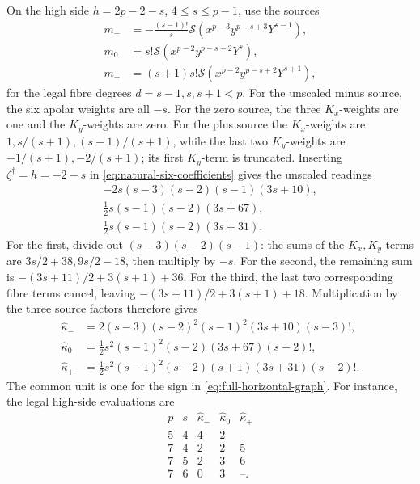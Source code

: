 \documentclass[11pt]{article}
\theoremstyle{plain}
\theoremstyle{definition}
\theoremstyle{remark}
\numberwithin{equation}{section}
\begin{document}
On the high side \(h=2p-2-s\), \(4\le s\le p-1\),
use the sources
\[
\begin{aligned}
 m_-&=-\frac{(s-1)!}{s}
       \mathscr S(x^{p-3}y^{p-s+3}Y^{s-1}),\\
 m_0&=s!\mathscr S(x^{p-2}y^{p-s+2}Y^s),\\
 m_+&=(s+1)s!\mathscr S(x^{p-2}y^{p-s+2}Y^{s+1}),
\end{aligned}
\]
for the legal fibre degrees \(d=s-1,s,s+1<p\).
For the unscaled minus source, the six apolar weights are all
\(-s\). For the zero source, the three \(K_x\)-weights are one
and the \(K_y\)-weights are zero. For the plus source the
\(K_x\)-weights are
\(1,s/(s+1),(s-1)/(s+1)\), while the last two \(K_y\)-weights
are \(-1/(s+1),-2/(s+1)\); its first \(K_y\)-term is truncated.
Inserting \(\zeta^\dagger=h=-2-s\) in
\eqref{eq:natural-six-coefficients} gives the unscaled readings
\[
\begin{aligned}
 -2s(s-3)(s-2)(s-1)(3s+10),\\
 \tfrac12s(s-1)(s-2)(3s+67),\\
 \tfrac12s(s-1)(s-2)(3s+31).
\end{aligned}
\]
For the first, divide out \((s-3)(s-2)(s-1)\):
the sums of the \(K_x,K_y\) terms are \(3s/2+38,9s/2-18\),
then multiply by \(-s\).
For the second, the remaining sum is
\(-(3s+11)/2+3(s+1)+36\).
For the third, the last two corresponding fibre terms cancel,
leaving \(-(3s+11)/2+3(s+1)+18\).
Multiplication by the three source factors therefore gives
\begin{equation}\label{eq:corrected-natural-kappas}
\begin{aligned}
 \widehat\kappa_-&=2(s-3)(s-2)^2(s-1)^2(3s+10)(s-3)!,\\
 \widehat\kappa_0&=\tfrac12s^2(s-1)^2(s-2)(3s+67)(s-2)!,\\
 \widehat\kappa_+&=\tfrac12s^2(s-1)^2(s-2)(s+1)(3s+31)(s-2)! .
\end{aligned}
\end{equation}
The common unit is one for the sign in
\eqref{eq:full-horizontal-graph}.
For instance, the legal high-side evaluations are
\[
\begin{array}{cc|ccc}
p&s&\widehat\kappa_-&\widehat\kappa_0&\widehat\kappa_+\\ \hline
5&4&4&2&\text{--}\\
7&4&2&2&5\\
7&5&2&3&6\\
7&6&0&3&\text{--}.
\end{array}
\]
\end{document}
